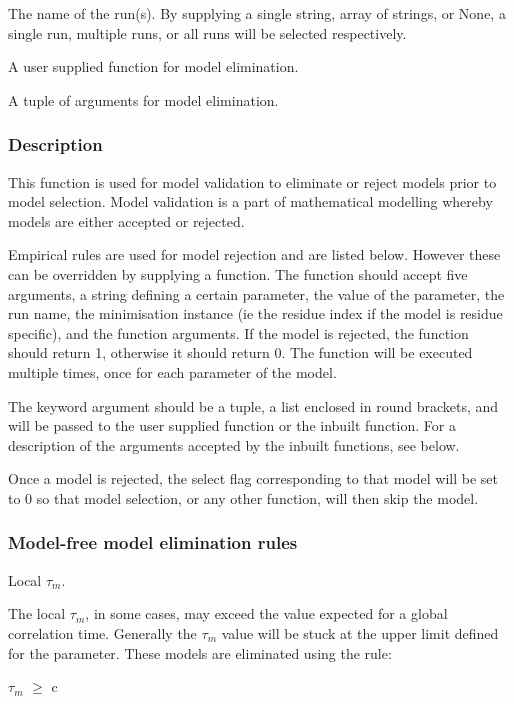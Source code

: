   The name of the run(s).  By supplying a single string, array of strings, or None, a single run, multiple runs, or all runs will be selected respectively.

  A user supplied function for model elimination.

  A tuple of arguments for model elimination.

\subsubsection{Description}

This function is used for model validation to eliminate or reject models prior to model
selection.  Model validation is a part of mathematical modelling whereby models are either
accepted or rejected.

Empirical rules are used for model rejection and are listed below.  However these can be
overridden by supplying a function.  The function should accept five arguments, a string
defining a certain parameter, the value of the parameter, the run name, the minimisation
instance (ie the residue index if the model is residue specific), and the function
arguments.  If the model is rejected, the function should return 1, otherwise it should
return 0.  The function will be executed multiple times, once for each parameter of the
model.

The 
 keyword argument should be a tuple, a list enclosed in round brackets, and will
be passed to the user supplied function or the inbuilt function.  For a description of the
arguments accepted by the inbuilt functions, see below.

Once a model is rejected, the select flag corresponding to that model will be set to 0 so
that model selection, or any other function, will then skip the model.



\subsubsection{Model-free model elimination rules}

Local $\tau_m$.

The local $\tau_m$, in some cases, may exceed the value expected for a global correlation time.
Generally the $\tau_m$ value will be stuck at the upper limit defined for the parameter.  These
models are eliminated using the rule:

    $\tau_m$ $\ge$ c

